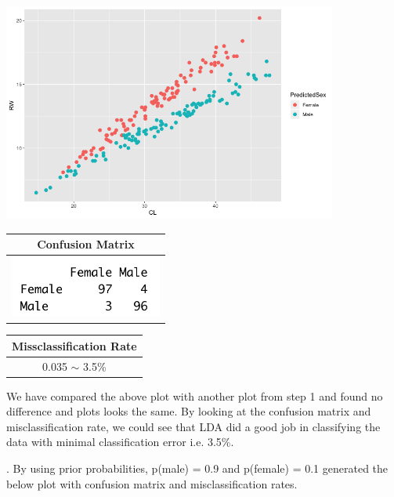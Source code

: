 \documentclass[a4paper,10pt]{article}
\begin{document}
\begin{center}
  \includegraphics[width=110mm,scale=0.10]{CL_RW_Lda_Plot_1.png} \par
  \begin{tabular}{|c|}
		\hline
    \textbf{Confusion Matrix} \\
    \hline
    \includegraphics[width=50mm,scale=0.10]{CL_RW_LDA_Confusion_Matrix_1.png} \\
    \hline
  \end{tabular}\par
  \begin{tabular}{|c|}
    \hline
    \textbf{Missclassification Rate} \\
    \hline
    0.035 $\sim$ 3.5\% \\
    \hline
  \end{tabular}
\end{center} \par
We have compared the above plot with another plot from step 1 and found no difference and plots looks the same. By
looking at the confusion matrix and misclassification rate, we could see that LDA did a good job in classifying the 
data with minimal classification error i.e. 3.5\%. \par
{}. By using prior probabilities, p(male) = 0.9 and p(female) = 0.1 generated the below plot with confusion matrix and
misclassification rates.
\end{document}
